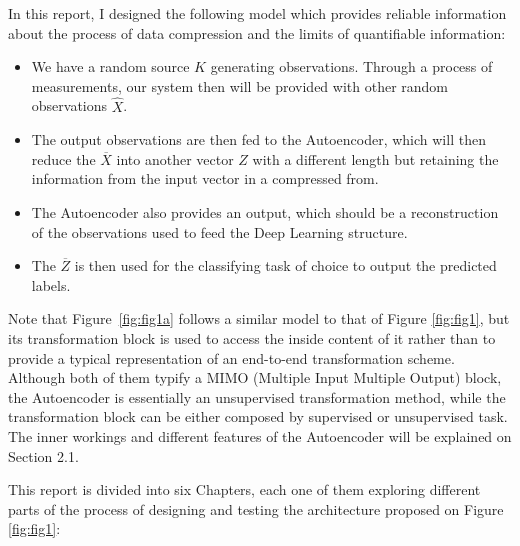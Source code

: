 
In this report, I designed the following model which provides reliable information about the process of data compression and the limits of quantifiable information:

\begin{itemize}
\item  We have a random source $K$ generating observations. Through a process of measurements, our system then will be provided with other random observations $\hat{X}$. 

\item The output observations  are then fed to the Autoencoder, which will then reduce the $\overline X$ into another vector $Z$ with a different length but retaining the information from the input vector in a compressed from. 

\item The Autoencoder also provides  an output, which should be a reconstruction of the observations used to feed the Deep Learning structure. 

\item The $\overline Z$ is then used for the classifying task of choice to output the predicted labels. 

\end{itemize}

Note that Figure~\ref{fig:fig1a} follows a similar model to that of Figure \ref{fig:fig1}, but its transformation block is used to access the inside content of it rather than to provide a typical representation of an end-to-end transformation scheme. Although both of them typify a MIMO (Multiple Input Multiple Output) block, the Autoencoder is essentially an unsupervised transformation method, while the transformation block can be either composed by supervised or unsupervised task. The inner workings and different features of the Autoencoder will be explained on Section 2.1. \par

This report is divided into six Chapters, each one of them exploring different parts of the process of designing and testing the architecture proposed on Figure \ref{fig:fig1}:

